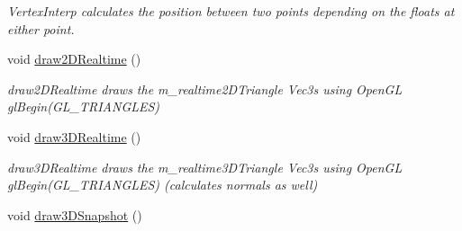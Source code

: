 \begin{DoxyCompactItemize}
$$\begin{DoxyCompactList}\small\item\em Vertex\-Interp calculates the position between two points depending on the floats at either point. \end{DoxyCompactList}\item 
\hypertarget{classMarchingAlgorithms_ad3b6c48ca79f9e91837a0760d6683674}{void \hyperlink{classMarchingAlgorithms_ad3b6c48ca79f9e91837a0760d6683674}{draw2\-D\-Realtime} ()}\label{classMarchingAlgorithms_ad3b6c48ca79f9e91837a0760d6683674}

\begin{DoxyCompactList}\small\item\em draw2\-D\-Realtime draws the m\-\_\-realtime2\-D\-Triangle Vec3s using Open\-G\-L gl\-Begin(\-G\-L\-\_\-\-T\-R\-I\-A\-N\-G\-L\-E\-S) \end{DoxyCompactList}\item 
\hypertarget{classMarchingAlgorithms_aceccb617c45738f065a38634a8ddb896}{void \hyperlink{classMarchingAlgorithms_aceccb617c45738f065a38634a8ddb896}{draw3\-D\-Realtime} ()}\label{classMarchingAlgorithms_aceccb617c45738f065a38634a8ddb896}

\begin{DoxyCompactList}\small\item\em draw3\-D\-Realtime draws the m\-\_\-realtime3\-D\-Triangle Vec3s using Open\-G\-L gl\-Begin(\-G\-L\-\_\-\-T\-R\-I\-A\-N\-G\-L\-E\-S) (calculates normals as well) \end{DoxyCompactList}\item 
\hypertarget{classMarchingAlgorithms_a53c874fc236e6a1da1c26f6c0dd9747a}{void \hyperlink{classMarchingAlgorithms_a53c874fc236e6a1da1c26f6c0dd9747a}{draw3\-D\-Snapshot} ()}\label{classMarchingAlgorithms_a53c874fc236e6a1da1c26f6c0dd9747a}


\end{DoxyCompactItemize}
